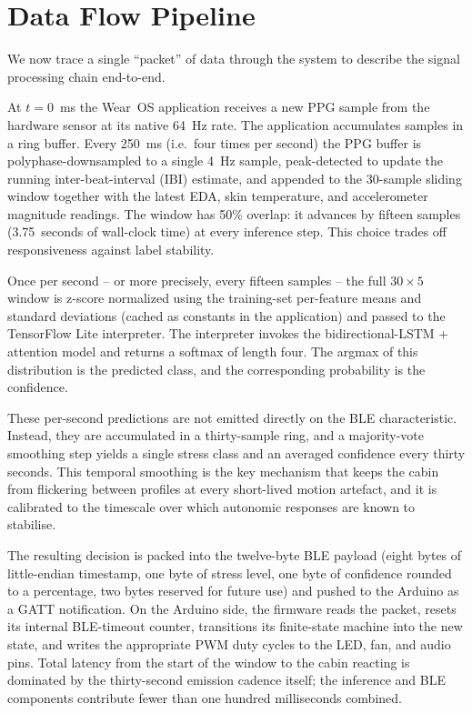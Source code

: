 \section{Data Flow Pipeline}
\label{sec:arch-pipeline}

We now trace a single ``packet'' of data through the system to
describe the signal processing chain end-to-end.

At $t=0$~ms the Wear~OS application receives a new PPG sample from
the hardware sensor at its native 64~Hz rate. The application
accumulates samples in a ring buffer. Every 250~ms (i.e.\ four times
per second) the PPG buffer is polyphase-downsampled to a single
4~Hz sample, peak-detected to update the running inter-beat-interval
(IBI) estimate, and appended to the 30-sample sliding window
together with the latest EDA, skin temperature, and accelerometer
magnitude readings. The window has 50\% overlap: it advances by
fifteen samples (3.75~seconds of wall-clock time) at every inference
step. This choice trades off responsiveness against label stability.

Once per second -- or more precisely, every fifteen samples -- the
full $30 \times 5$ window is z-score normalized using the training-set
per-feature means and standard deviations (cached as constants in
the application) and passed to the TensorFlow Lite interpreter.
The interpreter invokes the bidirectional-LSTM + attention model and
returns a softmax of length four. The argmax of this distribution is
the predicted class, and the corresponding probability is the
confidence.

These per-second predictions are not emitted directly on the BLE
characteristic. Instead, they are accumulated in a thirty-sample
ring, and a majority-vote smoothing step yields a single stress
class and an averaged confidence every thirty seconds. This
temporal smoothing is the key mechanism that keeps the cabin from
flickering between profiles at every short-lived motion artefact,
and it is calibrated to the timescale over which autonomic responses
are known to stabilise.

The resulting decision is packed into the twelve-byte BLE payload
(eight bytes of little-endian timestamp, one byte of stress level,
one byte of confidence rounded to a percentage, two bytes reserved
for future use) and pushed to the Arduino as a GATT notification.
On the Arduino side, the firmware reads the packet, resets its
internal BLE-timeout counter, transitions its finite-state machine
into the new state, and writes the appropriate PWM duty cycles to
the LED, fan, and audio pins. Total latency from the start of the
window to the cabin reacting is dominated by the thirty-second
emission cadence itself; the inference and BLE components contribute
fewer than one hundred milliseconds combined.

